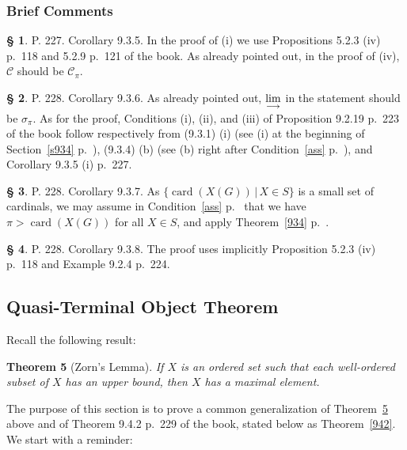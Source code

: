 \documentclass[12pt]{article}%
\newtheorem{thm}{Theorem}%
\theoremstyle{remark}
\theoremstyle{definition}
\newtheorem{s}[thm]{\S}%
\newcommand{\C}{\mathcal C}
\newcommand{\ilim}{\operatornamewithlimits{\underset{\longrightarrow}{lim}}}
\DeclareMathOperator{\card}{card}%
\begin{document}
\subsubsection{Brief Comments}

\begin{s} 
P. 227. Corollary 9.3.5. In the proof of (i) we use Propositions 5.2.3 (iv) p.~118 and 5.2.9 p.~121 of the book. As already pointed out, in the proof of (iv), $\C$ should be $\C_\pi$.
\end{s}

\begin{s} 
P. 228. Corollary 9.3.6. As already pointed out, $\ilim$ in the statement should be $\sigma_\pi$. As for the proof, Conditions (i), (ii), and (iii) of Proposition 9.2.19 p.~223 of the book follow respectively from (9.3.1) (i) (see (i) at the beginning of Section~\ref{s934} p.~\pageref{s934}), (9.3.4) (b) (see (b) right after Condition~\ref{ass} p.~\pageref{ass}), and Corollary 9.3.5 (i) p.~227.
\end{s}

\begin{s} 
P. 228. Corollary 9.3.7. As $\{\card(X(G))\,|\,X\in S\}$ is a small set of cardinals, we may assume in Condition~\ref{ass} p.~\pageref{ass} that we have $\pi>\card(X(G))$ for all $X\in S$, and apply Theorem~\ref{934} p.~\pageref{934}.
\end{s}

\begin{s} 
P. 228. Corollary 9.3.8. The proof uses implicitly Proposition 5.2.3 (iv) p.~118 and Example 9.2.4 p.~224.
\end{s}


\subsection{Quasi-Terminal Object Theorem }

Recall the following result:

\begin{thm}[Zorn's Lemma]\label{zorn}
If $X$ is an ordered set such that each well-ordered subset of $X$ has an upper bound, then $X$ has a maximal element.
\end{thm}

The purpose of this section is to prove a common generalization of Theorem~\ref{zorn} above and of Theorem 9.4.2 p.~229 of the book, stated below as Theorem~\ref{942}. We start with a reminder:
\end{document}
